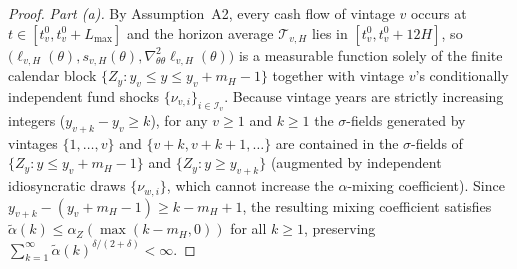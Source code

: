 \begin{proof}
\emph{Part (a).} By Assumption~A2, every cash flow of vintage $v$ occurs at $t \in [t_v^0, t_v^0 + L_{\max}]$ and the horizon average $\mathcal{T}_{v,H}$ lies in $[t_v^0, t_v^0 + 12H]$, so $\bigl(\ell_{v,H}(\theta), s_{v,H}(\theta), \nabla_{\theta\theta}^2 \ell_{v,H}(\theta)\bigr)$ is a measurable function solely of the finite calendar block $\bigl\{Z_y : y_v \le y \le y_v + m_H - 1\bigr\}$ together with vintage $v$'s conditionally independent fund shocks $\{\nu_{v,i}\}_{i\in\mathcal{I}_v}$. Because vintage years are strictly increasing integers ($y_{v+k} - y_v \ge k$), for any $v \ge 1$ and $k \ge 1$ the $\sigma$-fields generated by vintages $\{1,\dots,v\}$ and $\{v+k, v+k+1, \dots\}$ are contained in the $\sigma$-fields of $\{Z_y : y \le y_v + m_H - 1\}$ and $\{Z_y : y \ge y_{v+k}\}$ (augmented by independent idiosyncratic draws $\{\nu_{w,i}\}$, which cannot increase the $\alpha$-mixing coefficient). Since $y_{v+k} - (y_v + m_H - 1) \ge k - m_H + 1$, the resulting mixing coefficient satisfies $\tilde\alpha(k) \le \alpha_Z(\max(k - m_H, 0))$ for all $k \ge 1$, preserving $\sum_{k=1}^\infty \tilde\alpha(k)^{\delta/(2+\delta)} < \infty$.


\end{proof}
